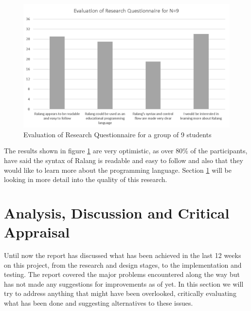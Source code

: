 \documentclass[a4paper]{article}
\begin{document}
	\newpage
	\begin{figure}[h!]
		\centering
		\includegraphics[width=0.8\linewidth]{images/evaluating_research_questionnaire.png}
		\caption{Evaluation of Research Questionnaire for a group of 9 students}
		\label{fig:questionnaire_evaluation}
	\end{figure}
	The results shown in figure \ref{fig:questionnaire_evaluation} are very optimistic, as over 80\% of the participants, have said the syntax of Ralang is readable and easy to follow and also that they would like to learn more about the programming language. Section \ref{Sec:AnalysisAndDiscussion} will be looking in more detail into the quality of this research.
	\newpage
	\section{Analysis, Discussion and Critical Appraisal}
	\label{Sec:AnalysisAndDiscussion}
	Until now the report has discussed what has been achieved in the last 12 weeks on this project, from the research and design stages, to the implementation and testing. The report covered the major problems encountered along the way but has not made any suggestions for improvements as of yet. In this section we will try to address anything that might have been overlooked, critically evaluating what has been done and suggesting alternatives to these issues.\\
	
\end{document}
